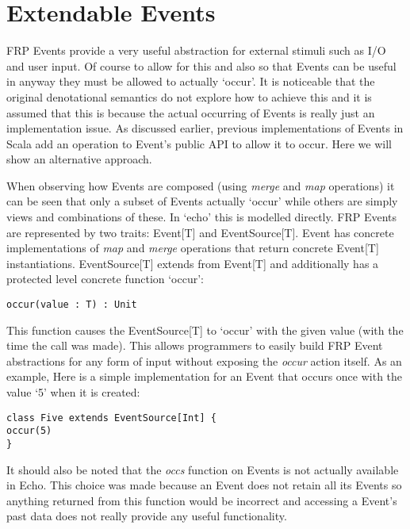   \section{Extendable Events}
    FRP Events provide a very useful abstraction for external stimuli such as I/O and user input. Of course
    to allow for this and also so that Events can be useful in anyway they must be allowed to actually `occur'.
    It is noticeable that the original denotational semantics \cite{Elliott1997} do not explore how to achieve
    this and it is assumed that this is because the actual occurring of Events is really just an implementation
    issue. As discussed earlier, previous implementations of Events in Scala add an operation to Event's
    public API to allow it to occur. Here we will show an alternative approach.
    
    When observing how Events are composed (using \emph{merge} and \emph{map} operations) it can be seen that
    only a subset of Events actually `occur' while others are simply views and combinations of these.
    In `echo' this is modelled directly. FRP Events are represented by two traits: Event[T] and EventSource[T].
    Event has concrete implementations of \emph{map} and \emph{merge} operations that
    return concrete Event[T] instantiations. EventSource[T] extends
    from Event[T] and additionally has a protected level concrete function `occur':
    
\begin{verbatim}
occur(value : T) : Unit
\end{verbatim}  

    This function causes the EventSource[T] to `occur' with the given value (with the time the call was made). This allows 
    programmers
    to easily build FRP Event abstractions for any form of input without exposing the \emph{occur} action itself.
    As an example, Here is a simple implementation for an Event that occurs once with the value `5' when it 
    is created:
    
\begin{verbatim}
class Five extends EventSource[Int] {
occur(5)
}
\end{verbatim}

    It should also be noted that the \emph{occs} function on Events is not actually available in Echo. This
    choice was made because an Event does not retain all its Events so anything returned from this 
    function would be incorrect and accessing a Event's past data does not really
    provide any useful functionality.

